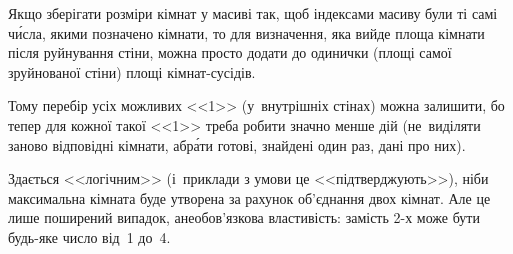 {Якщо зберігати розміри кімнат у масиві так, щоб індексами масиву були ті самі ч\'{и}сла, якими позначено кімнати, то для визначення, яка вийде площа кімнати після руйнування стіни, можна просто додати до одинички (площі самої зруйнованої стіни) площі кімнат-сусідів. 

Тому перебір усіх можливих <<1>> (у~внутрішніх стінах) можна залишити, бо тепер для кожної такої <<1>> треба робити значно менше дій 
(не~виділяти заново відповідні кімнати, а\nolinebreak[3] бр\'{а}ти готові, знайдені один раз, дані про них).

Здається <<логічним>> (і~приклади з умови це <<підтверджують>>), ніби максимальна кімната буде утворена за рахунок об’єднання двох кімнат. Але %
це лише поширений випадок, а\nolinebreak[3] не\nolinebreak[3] обов’язкова властивість: замість \mbox{2-х} може бути будь-яке число від~1 до~4. 

}
